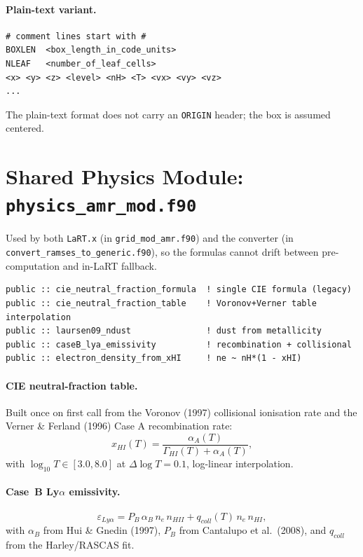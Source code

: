 \documentclass[english,a4paper]{my_memo}
\begin{document}
\paragraph{Plain-text variant.}
\begin{lstlisting}[style=shellstyle]
# comment lines start with #
BOXLEN  <box_length_in_code_units>
NLEAF   <number_of_leaf_cells>
<x> <y> <z> <level> <nH> <T> <vx> <vy> <vz>
...
\end{lstlisting}
The plain-text format does not carry an \texttt{ORIGIN} header; the box is
assumed centered.

\section{Shared Physics Module: \texttt{physics\_amr\_mod.f90}}

Used by both \texttt{LaRT.x} (in \texttt{grid\_mod\_amr.f90}) and the
converter (in \texttt{convert\_ramses\_to\_generic.f90}), so the formulas
cannot drift between pre-computation and in-LaRT fallback.

\begin{lstlisting}
public :: cie_neutral_fraction_formula  ! single CIE formula (legacy)
public :: cie_neutral_fraction_table    ! Voronov+Verner table interpolation
public :: laursen09_ndust               ! dust from metallicity
public :: caseB_lya_emissivity          ! recombination + collisional
public :: electron_density_from_xHI     ! ne ~ nH*(1 - xHI)
\end{lstlisting}

\paragraph{CIE neutral-fraction table.}  Built once on first call from the
Voronov (1997) collisional ionisation rate and the Verner \& Ferland
(1996) Case A recombination rate:
\[
   x_{HI}(T) = \frac{\alpha_A(T)}{\Gamma_{HI}(T) + \alpha_A(T)},
\]
with $\log_{10} T \in [3.0, 8.0]$ at $\Delta\log T = 0.1$, log-linear
interpolation.

\paragraph{Case~B Ly$\alpha$ emissivity.}
\[
   \varepsilon_{Ly\alpha} = P_B \, \alpha_B \, n_e \, n_{HII}
                          + q_{coll}(T) \, n_e \, n_{HI},
\]
with $\alpha_B$ from Hui \& Gnedin (1997), $P_B$ from Cantalupo et al.\
(2008), and $q_{coll}$ from the Harley/RASCAS fit.
\end{document}
